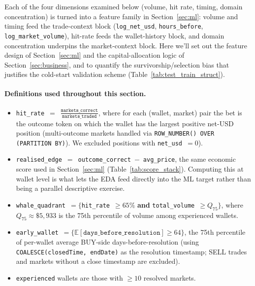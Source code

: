 \documentclass[11pt,a4paper]{article}
\newcommand{\edit}[1]{#1}
\newcommand{\WhaleVolQSeventyFive}{\edit{5{,}933}}
\newcommand{\EarlyThresholdDays}{\edit{64}}
\begin{document}

Each of the four dimensions examined below (volume, hit rate, timing, domain concentration) is turned into a feature family in Section~\ref{sec:ml}: volume and timing feed the trade-context block (\texttt{log\_net\_usd}, \texttt{hours\_before}, \texttt{log\_market\_volume}), hit-rate feeds the wallet-history block, and domain concentration underpins the market-context block. Here we'll set out the feature design of Section~\ref{sec:ml} and the capital-allocation logic of Section~\ref{sec:business}, and to quantify the survivorship/selection bias that justifies the cold-start validation scheme (Table~\ref{tab:test_train_struct}).

\paragraph{Definitions used throughout this section.}
\begin{itemize}[label=--, leftmargin=1.5em, itemsep=1pt]
    \item \texttt{hit\_rate}~$=$~$\frac{\texttt{markets\_correct}}{\texttt{markets\_traded}}$, where for each (wallet, market) pair the bet is the outcome token on which the wallet has the largest positive net-USD position (multi-outcome markets handled via \texttt{ROW\_NUMBER() OVER (PARTITION BY)}). We excluded positions with \texttt{net\_usd}~$=0$).
    \item \texttt{realised\_edge}~$=$~\texttt{outcome\_correct}~$-$~\texttt{avg\_price}, the same economic score used in Section~\ref{sec:ml} (Table~\ref{tab:score_stack}). Computing this at wallet level is what lets the EDA feed directly into the ML target rather than being a parallel descriptive exercise.
    \item \texttt{whale\_quadrant}~$=\{$\texttt{hit\_rate}~$\geq 65\%$ \textbf{and} \texttt{total\_volume}~$\geq Q_{75}\}$, where $Q_{75}\approx\$\WhaleVolQSeventyFive$ is the 75th percentile of volume among experienced wallets.
    \item \texttt{early\_wallet}~$=\{\mathbb{E}[\texttt{days\_before\_resolution}] \geq \EarlyThresholdDays\}$, the 75th percentile of per-wallet average BUY-side days-before-resolution (using \texttt{COALESCE(closedTime, endDate)} as the resolution timestamp; SELL trades and markets without a close timestamp are excluded).
    \item \texttt{experienced} wallets are those with $\geq 10$ resolved markets.
\end{itemize}
\end{document}

